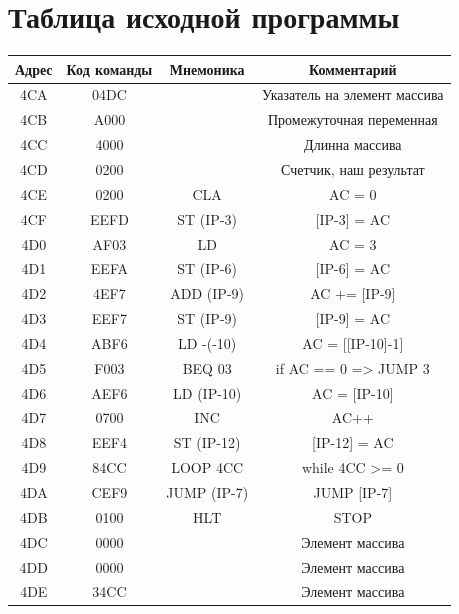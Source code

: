 \documentclass[14pt]{extreport}
\begin{document}
    \chapter{Таблица исходной программы}
        \begin{table}[h]

            \centering
            \begin{tabular}{|c|c|c|c|}
                \hline
                Адрес & Код команды & Мнемоника & Комментарий \\
                \hline
                4CA & 04DC  &  & Указатель на элемент массива\\
                4CB & A000 & & Промежуточная переменная\\
                4CC & 4000 & & Длинна массива\\
                4CD & 0200 & & Счетчик, наш результат\\
                \hline
                \hline
                4CE & 0200 & CLA  & AC = 0 \\
                4CF & EEFD & ST (IP-3)  & [IP-3] = AC \\
                4D0 & AF03 & LD #3  & AC = 3 \\
                4D1 & EEFA & ST (IP-6)  & [IP-6] = AC \\
                4D2 & 4EF7 & ADD (IP-9)  & AC += [IP-9] \\
                4D3 & EEF7 & ST (IP-9)  & [IP-9] = AC \\
                4D4 & ABF6 & LD -(-10)  & AC = [[IP-10]-1] \\
                4D5 & F003 & BEQ 03  & if AC == 0 => JUMP 3 \\
                4D6 & AEF6 & LD (IP-10)  & AC = [IP-10] \\
                4D7 & 0700 & INC  & AC++ \\
                4D8 & EEF4 & ST (IP-12)  & [IP-12] = AC \\
                4D9 & 84CC & LOOP 4CC  & while 4CC >= 0 \\
                4DA & CEF9 & JUMP (IP-7)  & JUMP [IP-7] \\
                4DB & 0100 & HLT  & STOP \\

                \hline
                \hline
                4DC & 0000 & &Элемент массива\\
                4DD & 0000 & &Элемент массива\\
                4DE & 34CC &  & Элемент массива\\
                \hline


            \end{tabular}\label{tab:table}
        \end{table}
\end{document}
